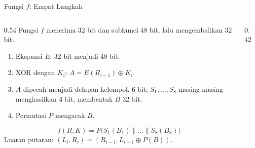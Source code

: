 \documentclass[aspectratio=169,11pt]{beamer}
\begin{document}
\begin{frame}{Fungsi $f$: Empat Langkah}
    \begin{columns}[T,onlytextwidth]
        \begin{column}{0.54\textwidth}
            \footnotesize
            Fungsi $f$ menerima 32 bit dan subkunci 48 bit, lalu
            mengembalikan 32 bit.
            \begin{enumerate}
                \item Ekspansi $E$: 32 bit menjadi 48 bit.
                \item XOR dengan $K_i$: $A=E(R_{i-1})\oplus K_i$.
                \item $A$ dipecah menjadi delapan kelompok 6 bit;
                      $S_1,\dots,S_8$ masing-masing menghasilkan 4 bit,
                      membentuk $B$ 32 bit.
                \item Permutasi $P$ mengacak $B$.
            \end{enumerate}
            \[
                f(R,K)=P\bigl(S_1(B_1)\parallel\dots\parallel
                S_8(B_8)\bigr)
            \]
            Luaran putaran: $(L_i,R_i)=(R_{i-1},L_{i-1}\oplus P(B))$.
        \end{column}
        \begin{column}{0.42\textwidth}
            \begin{center}
            \end{center}
        \end{column}
    \end{columns}
\end{frame}
\end{document}
